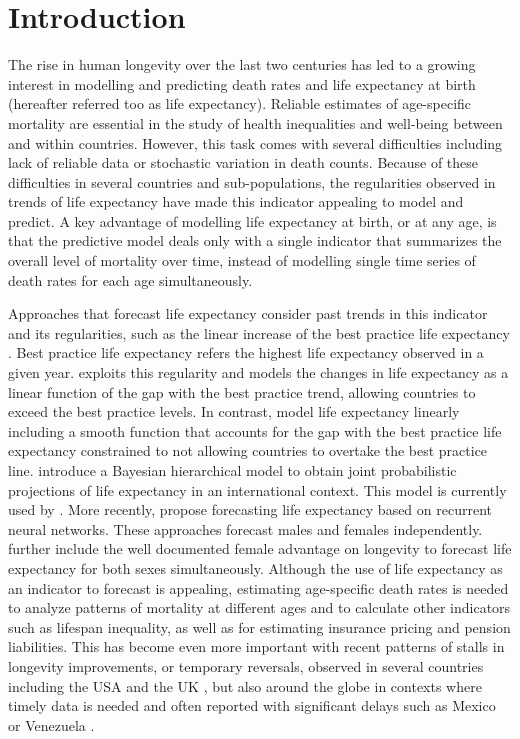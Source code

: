 \documentclass[a4,11pt]{article}
\begin{document}
\section{Introduction}
The rise in human longevity over the last two centuries has led to a growing interest in modelling and predicting death rates and life expectancy at birth (hereafter referred too as life expectancy). Reliable estimates of age-specific mortality are essential in the study of health inequalities and well-being between and within countries. However, this task comes with several difficulties including lack of reliable data or stochastic variation in death counts. Because of these difficulties in several countries and sub-populations, the regularities observed in trends of life expectancy have made this indicator appealing to model and predict. A key advantage of modelling life expectancy at birth, or at any age, is that the predictive model deals only with a single indicator that summarizes the overall level of mortality over time, instead of modelling single time series of death rates for each age simultaneously. 

Approaches that forecast life expectancy consider past trends in this indicator and its regularities, such as the linear increase of the best practice life expectancy \citep{OV2002}. Best practice life expectancy refers the highest life expectancy observed in a given year. \citet{Lee2006} exploits this regularity and models the changes in life expectancy as a linear function of the gap with the best practice trend, allowing countries to exceed the best practice levels. In contrast, \cite{TorriVaupel12} model life expectancy linearly including a smooth function that accounts for the gap with the best practice life expectancy constrained to not allowing countries to overtake the best practice line. \cite{Raftery13} introduce a Bayesian hierarchical model to obtain joint probabilistic projections of life expectancy in an international context. This model is currently used by \cite{UN_2019}. More recently, \cite{Nigri19} propose forecasting life expectancy based on recurrent neural networks. These approaches forecast males and females independently. \cite{Pascariu18} further include the well documented female advantage on longevity \citep{luy2003causes} to forecast life expectancy for both sexes simultaneously. Although the use of life expectancy as an indicator to forecast is appealing, estimating age-specific death rates is needed to analyze patterns of mortality at different ages and to calculate other indicators such as lifespan inequality, as well as for estimating insurance pricing and pension liabilities. This has become even more important with recent patterns of stalls in longevity improvements, or temporary reversals, observed in several countries including the USA and the UK \citep{mehta2020us,aburto2020EstimatingBurdenCOVID19,Ho}, but also around the globe in contexts where timely data is needed and often reported with significant delays such as Mexico or Venezuela \citep{aburto_16,garcia_19}.
\end{document}
